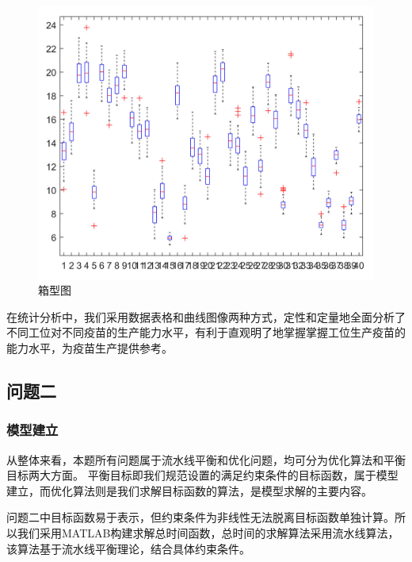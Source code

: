 \documentclass[UTF8]{ctexart}
\begin{document}
	\begin{figure}[H]
		\centering %
		\includegraphics[scale=0.5]{2_xiangxing.jpg}
		\caption{箱型图}
	\end{figure}
	在统计分析中，我们采用数据表格和曲线图像两种方式，定性和定量地全面分析了不同工位对不同疫苗的生产能力水平，有利于直观明了地掌握掌握工位生产疫苗的能力水平，为疫苗生产提供参考。
	
	\subsection{问题二}
	\subsubsection{模型建立}
	从整体来看，本题所有问题属于流水线平衡和优化问题，均可分为优化算法和平衡目标两大方面。%
	平衡目标即我们规范设置的满足约束条件的目标函数，属于模型建立，而优化算法则是我们求解目标函数的算法，是模型求解的主要内容。
		
	问题二中目标函数易于表示，但约束条件为非线性无法脱离目标函数单独计算。所以我们采用MATLAB构建求解总时间函数，总时间的求解算法采用流水线算法，该算法基于流水线平衡理论，结合具体约束条件。
	
\end{document}
